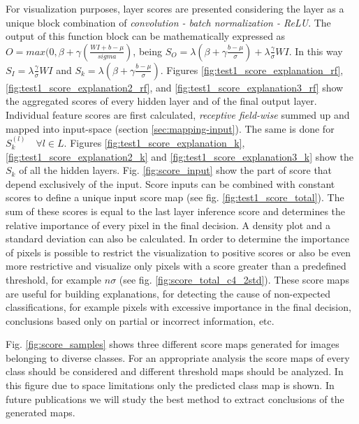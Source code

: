 \documentclass[preprint]{elsarticle}
\theoremstyle{definition} %
\theoremstyle{remark}
\begin{document}
For visualization purposes, layer scores are presented considering the layer as a unique block combination of \emph{convolution - batch normalization - ReLU}. The output of this function block can be mathematically expressed as $O = max(0, \beta + \gamma(\frac{WI + b - \mu}{sigma})$, being $S_O = \lambda (\beta + \gamma \frac{b - \mu}{\sigma}) + \lambda \frac{\gamma}{\sigma}WI$. In this way $S_I = \lambda \frac{\gamma}{\sigma}WI$ and $S_k = \lambda (\beta + \gamma \frac{b - \mu}{\sigma})$. Figures \ref{fig:test1_score_explanation_rf}, \ref{fig:test1_score_explanation2_rf}, and \ref{fig:test1_score_explanation3_rf} show the aggregated scores of every hidden layer and of the final output layer. Individual feature scores are first calculated, \emph{receptive field-wise} summed up and mapped into input-space (section \ref{sec:mapping-input}). The same is done for $S_k^{(l)} \quad \forall l \in L$. Figures \ref{fig:test1_score_explanation_k}, \ref{fig:test1_score_explanation2_k} and \ref{fig:test1_score_explanation3_k} show the $S_k$ of all the hidden layers. Fig. \ref{fig:score_input} show the part of score that depend exclusively of the input. Score inputs can be combined with constant scores to define a unique input score map (see fig. \ref{fig:test1_score_total}). The sum of these scores is equal to the last layer inference score and determines the relative importance of every pixel in the final decision. A density plot and a standard deviation can also be calculated. In order to determine the importance of pixels is possible to restrict the visualization to positive scores or also be even more restrictive and visualize only pixels with a score greater than a predefined threshold, for example $n \sigma$ (see fig. \ref{fig:score_total_c4_2std}). These score maps are useful for building explanations, for detecting the cause of non-expected classifications, for example pixels with excessive importance in the final decision, conclusions based only on partial or incorrect information, etc.

Fig. \ref{fig:score_samples} shows three different score maps generated for images belonging to diverse classes. For an appropriate analysis the score maps of every class should be considered and different threshold maps should be analyzed. In this figure due to space limitations only the predicted class map is shown. In future publications we will study the best method to extract conclusions of the generated maps.
\end{document}
